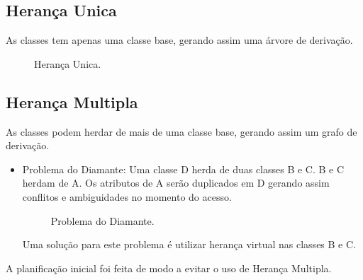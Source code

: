 \documentclass[rel_mlp]{iiufrgs}
\newcommand{\fonte}[1]{\\Fonte: {#1}}
\begin{document}
\subsection{Herança Unica} 	
As classes tem apenas uma classe base, gerando assim uma árvore de derivação.

\begin{figure}[htb]
    \centering
    \label{fig:figura2}
    \caption{Herança Unica.}
\end{figure}


\subsection{Herança Multipla} 	
As classes podem herdar de mais de uma classe base, gerando assim um grafo de derivação.
 \begin{itemize}
   \item Problema do Diamante: Uma classe D herda de duas classes B e C. B e C herdam de A. Os atributos de A serão duplicados em D gerando   assim conflitos e ambiguidades no momento do acesso. 
\begin{figure}[htb]
    \centering
    \label{fig:figura3}
    \caption{Problema do Diamante.}
\end{figure}
   
   
   
   Uma solução para este problema  é utilizar herança virtual nas classes B e C.
 \end{itemize}  	
 A planificação inicial foi feita de modo a evitar o uso de Herança Multipla.
 
\end{document}
